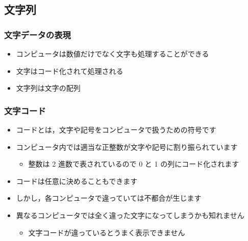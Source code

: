 \subsection{文字列}
\begin{frame}
\frametitle{文字データの表現}
  \begin{itemize}
\item コンピュータは数値だけでなく文字も処理することができる
\item 文字はコード化されて処理される
\item 文字列は文字の配列
  \end{itemize}
\end{frame}
\begin{frame}
\frametitle{文字コード}
  \begin{itemize}
\item コードとは，文字や記号をコンピュータで扱うための符号です
\item コンピュータ内では適当な正整数が文字や記号に割り振られています
    \begin{itemize}
\item 整数は 2 進数で表されているので 0 と 1 の列にコード化されます
    \end{itemize}
\item コードは任意に決めることもできます
\item しかし，各コンピュータで違っていては不都合が生じます
\item 異なるコンピュータでは全く違った文字になってしまうかも知れません
    \begin{itemize}
\item 文字コードが違っているとうまく表示できません
    \end{itemize}
  \end{itemize}
\end{frame}
